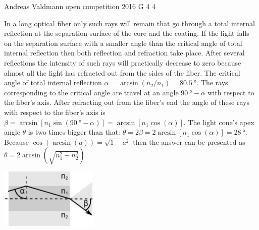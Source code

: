 \documentclass[11pt]{article}
\begin{document}
{Andreas Valdmann} %
{open competition} %
{2016} %
{G 4} %
{4} %
{

\ifEngSolution
In a long optical fiber only such rays will remain that go through a total internal reflection at the separation surface of the core and the coating. If the light falls on the separation surface with a smaller angle than the critical angle of total internal reflection then both reflection and refraction take place. After several reflections the intensity of such rays will practically decrease to zero because almost all the light has refracted out from the sides of the fiber. The critical angle of total internal reflection $\alpha=\arcsin(n_2/n_1)=\SI{80,5}{\degree}$. The rays corresponding to the critical angle are travel at an angle $\SI{90}{\degree}-\alpha$ with respect to the fiber’s axis. After refracting out from the fiber’s end the angle of these rays with respect to the fiber’s axis is $\beta=\arcsin[n_1\sin(\SI{90}{\degree}-\alpha)]=\arcsin[n_1\cos(\alpha)]$. The light cone’s apex angle $\theta$ is two times bigger than that: $\theta=2\beta=2\arcsin[n_1\cos(\alpha)]=\SI{28}{\degree}$. Because $\cos(\arcsin(a))=\sqrt{1-a^2}$ then the answer can be presented as $\theta=2\arcsin(\sqrt{n_1^2-n_2^2})$.
\begin{center}
    \includegraphics[width=0.35\textwidth]{2016-lahg-04-kiud}
\end{center}
\fi
}
\end{document}
